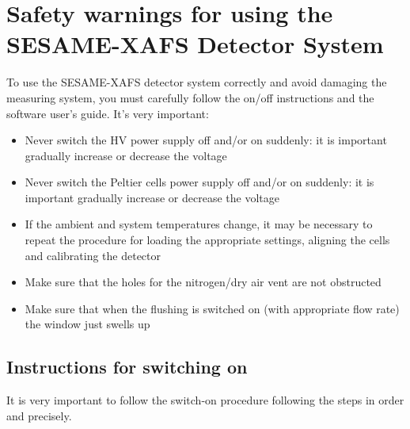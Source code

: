 \documentclass[a4paper,12pt,oneside,pdflatex,italian,final,twocolumn]{article}
\begin{document}
\section{Safety warnings for using the SESAME-XAFS Detector System} \label{sicurezza}
To use the SESAME-XAFS detector system correctly and avoid damaging the measuring system, you must carefully follow the on/off instructions and the software user's guide.
It's very important:
\begin{itemize}
    \item Never switch the HV power supply off and/or on suddenly: it is important gradually increase or decrease the voltage
    \item Never switch the Peltier cells power supply off and/or on suddenly: it is important gradually increase or decrease the voltage
    \item  If the ambient and system temperatures change, it may be necessary to repeat the procedure for loading the appropriate settings, aligning the cells and calibrating the detector
    \item Make sure that the holes for the nitrogen/dry air vent are not obstructed
    \item Make sure that when the flushing is switched on (with appropriate flow rate) the window just swells up
\end{itemize}

    \subsection{Instructions for switching on} \label{accensione}
  It is very important to follow the switch-on procedure following the steps in order and precisely.
    
\end{document}
